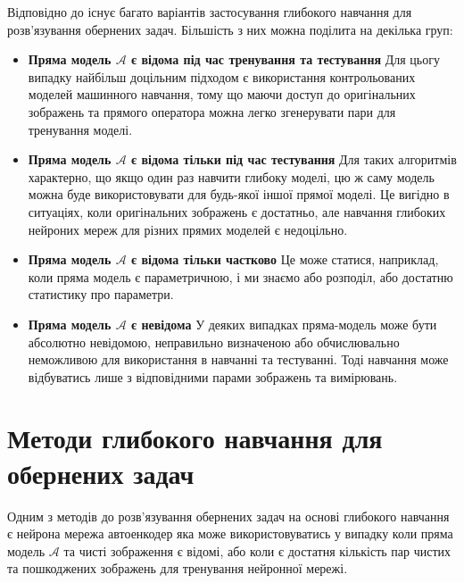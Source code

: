 \documentclass[14pt,a4paper]{extarticle}
\newcounter{e}
\numberwithin{equation}{section}
\numberwithin{figure}{section}
\begin{document}
	Відповідно до \cite{ongie2020deep} існує багато варіантів застосування глибокого навчання для розв'язування обернених задач. Більшість з них можна поділита на декілька груп:
	\begin{itemize}
		\item \textbf{Пряма модель $\mathcal{A}$ є відома під час тренування та тестування} \newline
		Для цьогу випадку найбільш доцільним підходом є використання контрольованих моделей машинного навчання, тому що маючи доступ до оригінальних зображень та прямого оператора можна легко згенерувати пари для тренування моделі.
				
		\item \textbf{Пряма модель $\mathcal{A}$ є відома тільки під час тестування} \newline
		Для таких алгоритмів характерно, що якщо один раз навчити глибоку моделі, цю ж саму модель можна буде використовувати для будь-якої іншої прямої моделі. Це вигідно в ситуаціях, коли оригінальних зображень є достатньо, але навчання глибоких нейроних мереж для різних прямих моделей є недоцільно.

		\item \textbf{Пряма модель $\mathcal{A}$ є відома тільки частково} \newline
		Це може статися, наприклад, коли пряма модель є параметричною, і ми знаємо або розподіл, або
		достатню статистику про параметри.

		\item \textbf{Пряма модель $\mathcal{A}$ є невідома} \newline
		У деяких випадках пряма-модель може бути абсолютно невідомою, неправильно визначеною або обчислювально неможливою для використання в навчанні та тестуванні. Тоді навчання може відбуватись лише з відповідними парами зображень та вимірювань. 
	\end{itemize}

	\newpage
	\thispagestyle{empty}
	\section{Методи глибокого навчання для обернених задач}

	Одним з методів до розв'язування обернених задач на основі глибокого навчання є нейрона мережа автоенкодер яка може використовуватись у випадку коли пряма модель $\mathcal{A}$ та чисті зображення є відомі, або коли є достатня кількість пар чистих та пошкоджених зображень для тренування нейронної мережі.
\end{document}
